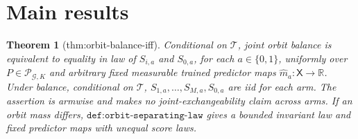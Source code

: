 \documentclass{article}
\newtheorem{theorem}{Theorem}
\begin{document}
\section{Main results}

\begin{theorem}[thm:orbit-balance-iff]\label{thm:orbit-balance-iff}
Conditional on \(\mathcal T\), joint orbit balance is equivalent to equality in law of \(S_{i,a}\) and \(S_{0,a}\), for each \(a\in\{0,1\}\), uniformly over \(P\in\mathcal P_{\mathcal G,K}\) and arbitrary fixed measurable trained predictor maps \(\widehat m_a:\mathsf X\to\mathbb R\). Under balance, conditional on \(\mathcal T\), \(S_{1,a},\ldots,S_{M,a},S_{0,a}\) are iid for each arm. The assertion is armwise and makes no joint-exchangeability claim across arms. If an orbit mass differs, \(\texttt{def:orbit-separating-law}\) gives a bounded invariant law and fixed predictor maps with unequal score laws.
\end{theorem}
\end{document}
